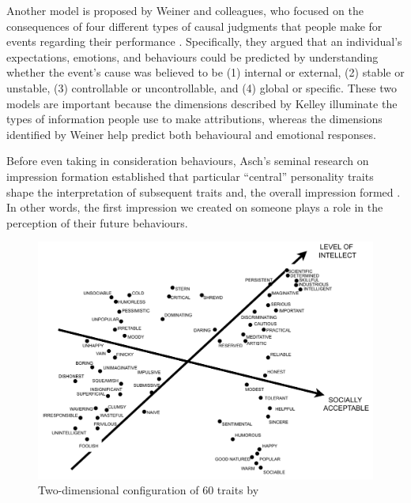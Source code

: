 Another model is proposed by Weiner and colleagues, who focused on the consequences of four different types of causal judgments that people make for events
regarding their performance \cite{Weiner1972}. Specifically, they argued that an individual's expectations, emotions, and behaviours could be predicted by understanding whether the event's cause was believed to be (1) internal or external, (2) stable or unstable, (3) controllable or uncontrollable, and (4) global or specific.  These two models are important because the dimensions described by Kelley illuminate the types of information people use to make attributions, whereas the dimensions identified by Weiner help predict both behavioural and emotional responses. %

Before even taking in consideration behaviours,  Asch’s seminal research on impression formation established that particular “central” personality traits shape the interpretation of subsequent traits and,  the overall impression formed \cite{Asch1961}.  In other words, the first impression we created on someone plays a role in the perception of their future behaviours.

\begin{figure}
  \includegraphics[width=\linewidth]{figures/TwoDimensionsOfAttributions.pdf}
  \caption{Two-dimensional configuration of 60 traits by \cite{Rosenberg1968}}
  \label{fig:twoDimensions}
\end{figure}

